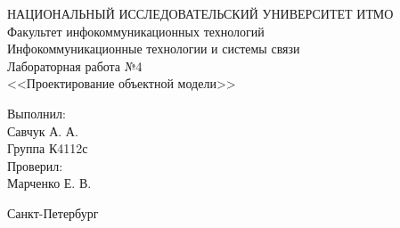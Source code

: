 \begin{titlepage}

  \begin{center}
    НАЦИОНАЛЬНЫЙ ИССЛЕДОВАТЕЛЬСКИЙ УНИВЕРСИТЕТ ИТМО\\[0.1cm]
    Факультет инфокоммуникационных технологий\\
    Инфокоммуникационные технологии и системы связи\\[5cm]

    {\Large Лабораторная работа №4}\\[0.1cm]
    \noindent<<Проектирование объектной модели>>\\[3cm]
  \end{center}

  \begin{minipage}{0.65\linewidth}
    \hspace{\fill}
  \end{minipage}
  \begin{minipage}{0.25\linewidth}
    Выполнил:\\
    Савчук А. А.\\
    Группа К4112с \\

    Проверил:\\
    Марченко Е. В.
  \end{minipage}

  \vfill

  \begin{center}
    Санкт-Петербург\\
    \the\year
  \end{center}

\end{titlepage}
